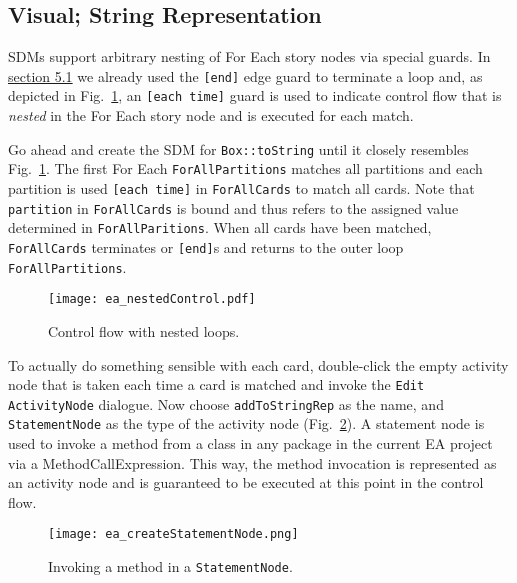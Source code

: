 \newpage
\subsection{Visual; String Representation}
\visHeader
\hypertarget{stringRep vis}{}

SDMs support arbitrary nesting of For Each story nodes via special guards. In \hyperlink{emptyPartition vis}{section 5.1} 
we already used the \texttt{[end]} edge guard to terminate a loop and, as depicted in Fig.~\ref{fig:sdm_tostring_1}, an
\texttt{[each time]} guard is used to indicate control flow that is \emph{nested} in the For Each story node and is executed for each match.

Go ahead and create the SDM for \texttt{Box::toString} until it closely resembles Fig.~\ref{fig:sdm_tostring_1}. The first For Each \texttt{ForAllPartitions}
matches all partitions and each partition is used \texttt{[each time]} in \texttt{ForAllCards} to match all cards. Note that \texttt{partition} in
\texttt{ForAllCards} is bound  and thus refers to the assigned value determined in \texttt{ForAllParitions}. When all cards have been matched,
\texttt{ForAllCards} terminates or \texttt{[end]}s and returns to the outer loop \texttt{ForAllPartitions}.

\begin{figure}[htbp]
\begin{center}
  \texttt{[image: ea\_nestedControl.pdf]}
  \caption{Control flow with nested loops.}  
  \label{fig:sdm_tostring_1}
\end{center}
\end{figure}

To actually do something sensible with each card, double-click the empty activity node that is taken each time a card is matched and invoke the \texttt{Edit
ActivityNode} dialogue. Now choose \texttt{addToStringRep} as the name, and \texttt{StatementNode} as the type of the activity node
(Fig.~\ref{fig:sdm_tostring_2}).  A statement node is used to invoke a method from a class in any package in the current EA project via a
MethodCallExpression. This way, the method invocation is represented as an activity node and is guaranteed to be executed at this point in the control flow.

\begin{figure}[htbp]
\begin{center}
  \texttt{[image: ea\_createStatementNode.png]}
  \caption{Invoking a method in a \texttt{StatementNode}.}  
  \label{fig:sdm_tostring_2}
\end{center}
\end{figure}

